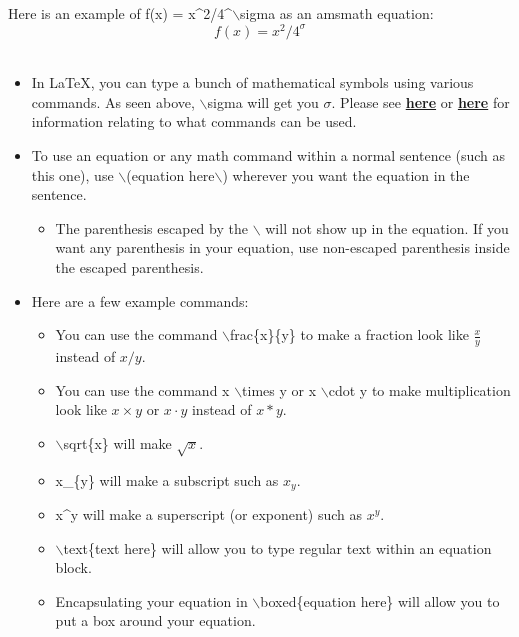 	Here is an example of  f(x) = x\string^2/4\string^$\backslash$sigma as an amsmath equation:\\
	\begin{equation*}
		f(x) = x^2/4^\sigma
	\end{equation*}
	\\
	\begin{itemize}
		\item In \LaTeX{}, you can type a bunch of mathematical symbols using various commands. As seen above, $\backslash$sigma will get you \(\sigma\). Please see \href{http://tug.ctan.org/info/undergradmath/undergradmath.pdf}{\textbf{here}} or \href{http://tug.ctan.org/info/short-math-guide/short-math-guide.pdf}{\textbf{here}} for information relating to what commands can be used.
		\item To use an equation or any math command within a normal sentence (such as this one), use $\backslash$(equation here$\backslash$) wherever you want the equation in the sentence.
		\begin{itemize}
			\item The parenthesis escaped by the $\backslash$ will not show up in the equation. If you want any parenthesis in your equation, use non-escaped parenthesis inside the escaped parenthesis.
		\end{itemize}
		\item Here are a few example commands:
		\begin{itemize}
			\item You can use the command $\backslash$frac\{x\}\{y\} to make a fraction look like \(\frac{x}{y}\) instead of \(x/y\).
			\item You can use the command x $\backslash$times y  or x $\backslash$cdot y to make multiplication look like \(x \times y\) or \(x \cdot y\) instead of \(x*y\).
			\item $\backslash$sqrt\{x\} will make \(\sqrt{x}\).
			\item x\_\{y\} will make a subscript such as \(x_{y}\).
			\item x\string^y will make a superscript (or exponent) such as \(x^y\).
			\item $\backslash$text\{text here\} will allow you to type regular text within an equation block.
			\item Encapsulating your equation in $\backslash$boxed\{equation here\} will allow you to put a box around your equation.
		\end{itemize}
	\end{itemize}